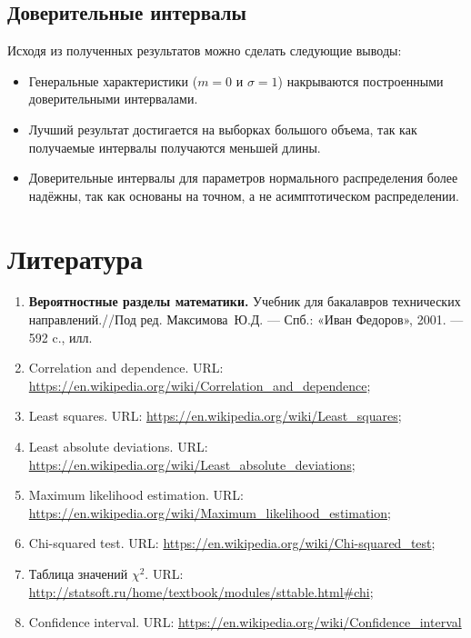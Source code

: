 \documentclass[12pt,a4paper]{article}
\begin{document}
	\subsection{Доверительные интервалы}
		Исходя из полученных результатов можно сделать следующие выводы:
		\begin{itemize}
			\item Генеральные характеристики ($m = 0$ и $\sigma = 1$) накрываются построенными доверительными интервалами.
			
			\item Лучший результат достигается на выборках большого объема, так как получаемые интервалы получаются меньшей длины.
			
			\item Доверительные интервалы для параметров нормального распределения более надёжны, так как основаны на точном, а не асимптотическом распределении.
		\end{itemize}

\newpage
\section{Литература}
	\begin{enumerate}
		\item \label{Book_1} \textbf{Вероятностные разделы математики.} Учебник для бакалавров технических направлений.//Под ред. Максимова~Ю.Д. --- Спб.: «Иван Федоров», 2001. --- 592 c., илл.
		
		\item Correlation and dependence. URL: \url{https://en.wikipedia.org/wiki/Correlation_and_dependence};
		
		\item Least squares. URL: \url{https://en.wikipedia.org/wiki/Least_squares};
		
		\item Least absolute deviations. URL: \url{https://en.wikipedia.org/wiki/Least_absolute_deviations};
		
		\item Maximum likelihood estimation. URL: \url{https://en.wikipedia.org/wiki/Maximum_likelihood_estimation};
		
		\item Chi-squared test. URL: \url{https://en.wikipedia.org/wiki/Chi-squared_test};
		
		\item Таблица значений $\chi^2$. URL: \url{http://statsoft.ru/home/textbook/modules/sttable.html#chi};
		
		\item Confidence interval. URL: \url{https://en.wikipedia.org/wiki/Confidence_interval}
	\end{enumerate}
\end{document}
